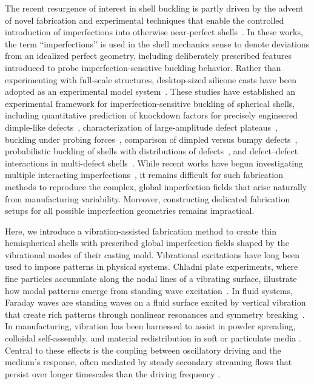 \documentclass[twocolumn,letter,11pt]{article}
\begin{document}
The recent resurgence of interest in shell buckling is partly driven by the advent of novel fabrication and experimental techniques that enable the controlled introduction of imperfections into otherwise near-perfect shells~\cite{hutchinson2016buckling}. In these works, the term ``imperfections'' is used in the shell mechanics sense to denote deviations from an idealized perfect geometry, including deliberately prescribed features introduced to probe imperfection-sensitive buckling behavior. Rather than experimenting with full-scale structures, desktop-sized silicone casts have been adopted as an experimental model system~\cite{lee2016fabrication,lee2016geometric}. 
These studies have established an experimental framework for imperfection-sensitive buckling of spherical shells, including quantitative prediction of knockdown factors for precisely engineered dimple-like defects~\cite{lee2016geometric}, characterization of large-amplitude defect 
plateaus~\cite{jimenez2017technical}, buckling under probing 
forces~\cite{marthelot2017buckling}, comparison of dimpled versus bumpy 
defects~\cite{abbasi2023comparing}, probabilistic buckling of shells with 
distributions of defects~\cite{derveni2023probabilistic}, and defect--defect 
interactions in multi-defect shells~\cite{derveni2025defect,derveni2025most}. While recent works have begun investigating multiple interacting imperfections~\cite{baizhikova2024uncovering,derveni2025defect}, it remains difficult for such fabrication methods to reproduce the complex, global imperfection fields that arise naturally from manufacturing variability. Moreover, constructing dedicated fabrication setups for all possible imperfection geometries remains impractical.

Here, we introduce a vibration-assisted fabrication method to create thin hemispherical shells with prescribed global imperfection fields shaped by the vibrational modes of their casting mold. 
Vibrational excitations have long been used to impose patterns in physical systems. Chladni plate experiments, where fine particles accumulate along the nodal lines of a vibrating surface, illustrate how modal patterns emerge from standing wave excitation~\cite{rossing2013principles}. In fluid systems, Faraday waves are standing waves on a fluid surface excited by vertical vibration that create rich patterns through nonlinear resonances and symmetry breaking~\cite{douady1988pattern}. In manufacturing, vibration has been harnessed to assist in powder spreading, colloidal self-assembly, and material redistribution in soft or particulate media \cite{wu2020vibration, baudoin2020acoustic,kopitca2021programmable,derayatifar2024holographic,ledda2025fluid}. Central to these effects is the coupling between oscillatory driving and the medium's response, often mediated by steady secondary streaming flows that persist over longer timescales than the driving frequency \cite{perinet2017streaming}.
\end{document}
